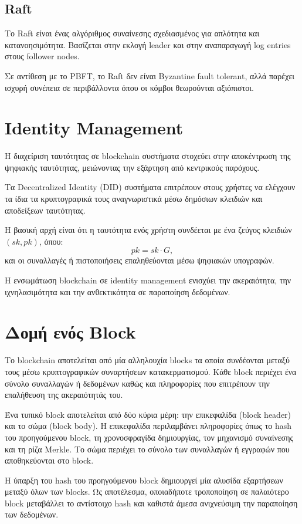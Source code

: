\documentclass[12pt,a4paper]{report}
\begin{document}
\subsection{Raft}

Το Raft είναι ένας αλγόριθμος συναίνεσης σχεδιασμένος για απλότητα και κατανοησιμότητα. Βασίζεται στην εκλογή leader και στην αναπαραγωγή log entries στους follower nodes.

Σε αντίθεση με το PBFT, το Raft δεν είναι Byzantine fault tolerant, αλλά παρέχει ισχυρή συνέπεια σε περιβάλλοντα όπου οι κόμβοι θεωρούνται αξιόπιστοι.


\section{Identity Management}

Η διαχείριση ταυτότητας σε blockchain συστήματα στοχεύει στην αποκέντρωση της ψηφιακής ταυτότητας, μειώνοντας την εξάρτηση από κεντρικούς παρόχους.

Τα Decentralized Identity (DID) συστήματα επιτρέπουν στους χρήστες να ελέγχουν τα ίδια τα κρυπτογραφικά τους αναγνωριστικά μέσω δημόσιων κλειδιών και αποδείξεων ταυτότητας.

Η βασική αρχή είναι ότι η ταυτότητα ενός χρήστη συνδέεται με ένα ζεύγος κλειδιών $(sk, pk)$, όπου:
\[
pk = sk \cdot G,
\]
και οι συναλλαγές ή πιστοποιήσεις επαληθεύονται μέσω ψηφιακών υπογραφών.

Η ενσωμάτωση blockchain σε identity management ενισχύει την ακεραιότητα, την ιχνηλασιμότητα και την ανθεκτικότητα σε παραποίηση δεδομένων. 

\section{Δομή ενός Block}

Το blockchain αποτελείται από μία αλληλουχία blocks τα οποία συνδέονται μεταξύ τους μέσω κρυπτογραφικών συναρτήσεων κατακερματισμού. Κάθε block περιέχει ένα σύνολο συναλλαγών ή δεδομένων καθώς και πληροφορίες που επιτρέπουν την επαλήθευση της ακεραιότητάς του.

Ένα τυπικό block αποτελείται από δύο κύρια μέρη: την επικεφαλίδα (block header) και το σώμα (block body). Η επικεφαλίδα περιλαμβάνει πληροφορίες όπως το hash του προηγούμενου block, τη χρονοσφραγίδα δημιουργίας, τον μηχανισμό συναίνεσης και τη ρίζα Merkle. Το σώμα περιέχει το σύνολο των συναλλαγών ή εγγραφών που αποθηκεύονται στο block.

Η ύπαρξη του hash του προηγούμενου block δημιουργεί μία αλυσίδα εξαρτήσεων μεταξύ όλων των blocks. Ως αποτέλεσμα, οποιαδήποτε τροποποίηση σε παλαιότερο block μεταβάλλει το αντίστοιχο hash και καθιστά άμεσα ανιχνεύσιμη την παραποίηση των δεδομένων.
\end{document}
